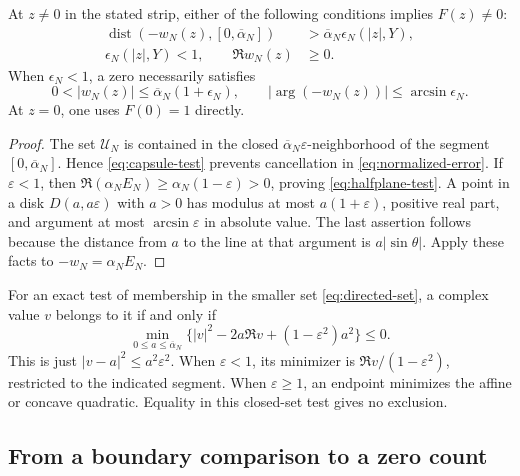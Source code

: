 \begin{proposition}
\label{prop:directed-exclusion}
At \(z\ne0\) in the stated strip, either of the following conditions
implies \(F(z)\ne0\):
\begin{align}
 \operatorname{dist}(-w_N(z),[0,\overline\alpha_N])
     &>\overline\alpha_N\epsilon_N(|z|,Y),
       \label{eq:capsule-test}\\
 \epsilon_N(|z|,Y)<1,\qquad \Re w_N(z)&\ge0.
       \label{eq:halfplane-test}
\end{align}
When \(\epsilon_N<1\), a zero necessarily satisfies
\begin{equation}
 0<|w_N(z)|\le\overline\alpha_N(1+\epsilon_N),\qquad
 |\arg(-w_N(z))|\le\arcsin\epsilon_N.
 \label{eq:necessary-sector}
\end{equation}
At \(z=0\), one uses \(F(0)=1\) directly.
\end{proposition}

\begin{proof}
The set \(\mathcal U_N\) is contained in the closed
\(\overline\alpha_N\varepsilon\)-neighborhood of the segment
\([0,\overline\alpha_N]\). Hence \eqref{eq:capsule-test}
prevents cancellation in \eqref{eq:normalized-error}.
If \(\varepsilon<1\), then
\(\Re(\alpha_NE_N)\ge\alpha_N(1-\varepsilon)>0\), proving
\eqref{eq:halfplane-test}. A point in a disk \(D(a,a\varepsilon)\)
with \(a>0\) has modulus at most \(a(1+\varepsilon)\), positive
real part, and argument at most \(\arcsin\varepsilon\) in
absolute value. The last assertion follows because the distance
from \(a\) to the line at that argument is \(a|\sin\theta|\).
Apply these facts to \(-w_N=\alpha_NE_N\).
\end{proof}

For an exact test of membership in the smaller set
\eqref{eq:directed-set}, a complex value \(v\) belongs to it if and
only if
\begin{equation}
 \min_{0\le a\le\overline\alpha_N}
 \bigl\{|v|^2-2a\Re v+(1-\varepsilon^2)a^2\bigr\}\le0.
 \label{eq:directed-membership}
\end{equation}
This is just \(|v-a|^2\le a^2\varepsilon^2\). When
\(\varepsilon<1\), its minimizer is
\(\Re v/(1-\varepsilon^2)\), restricted to the indicated segment.
When \(\varepsilon\ge1\), an endpoint minimizes the affine or
concave quadratic. Equality in this closed-set test gives no exclusion.

\subsection{From a boundary comparison to a zero count}

